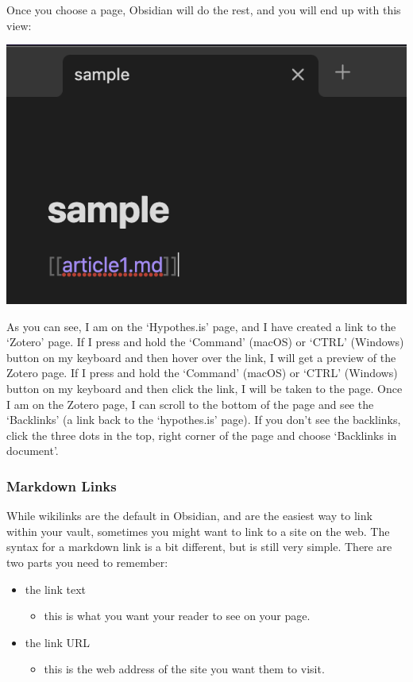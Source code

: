 \documentclass[
]{book}
\providecommand{\tightlist}{%
  \setlength{\itemsep}{0pt}\setlength{\parskip}{0pt}}
\theoremstyle{definition}
\theoremstyle{definition}
\theoremstyle{definition}
\theoremstyle{definition}
\theoremstyle{remark}
\begin{document}
Once you choose a page, Obsidian will do the rest, and you will end up with this view:

\includegraphics{assets/u3/wikilink2.png}

As you can see, I am on the `Hypothes.is' page, and I have created a link to the `Zotero' page. If I press and hold the `Command' (macOS) or `CTRL' (Windows) button on my keyboard and then hover over the link, I will get a preview of the Zotero page. If I press and hold the `Command' (macOS) or `CTRL' (Windows) button on my keyboard and then click the link, I will be taken to the page. Once I am on the Zotero page, I can scroll to the bottom of the page and see the `Backlinks' (a link back to the `hypothes.is' page). If you don't see the backlinks, click the three dots in the top, right corner of the page and choose `Backlinks in document'.

\hypertarget{markdown-links}{%
\subsubsection*{Markdown Links}\label{markdown-links}}

While wikilinks are the default in Obsidian, and are the easiest way to link within your vault, sometimes you might want to link to a site on the web. The syntax for a markdown link is a bit different, but is still very simple. There are two parts you need to remember:

\begin{itemize}
\tightlist
\item
  the link text

  \begin{itemize}
  \tightlist
  \item
    this is what you want your reader to see on your page.
  \end{itemize}
\item
  the link URL

  \begin{itemize}
  \tightlist
  \item
    this is the web address of the site you want them to visit.
  \end{itemize}
\end{itemize}
\end{document}
